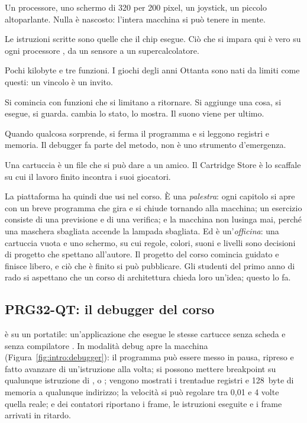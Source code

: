 \begin{description}[style=nextline,leftmargin=1.5em]
\item[Abbastanza piccola da capirla.] Un processore, uno schermo di 320 per
  200 pixel, un joystick, un piccolo altoparlante. Nulla è nascosto: l'intera
  macchina si può tenere in mente.
\item[Vera, non simulata.] Le istruzioni scritte sono quelle che il chip
  esegue. Ciò che si impara qui è vero su ogni processore \riscv, da un
  sensore a un supercalcolatore.
\item[I limiti rendono creativi.] Pochi kilobyte e tre funzioni. I giochi
  degli anni Ottanta sono nati da limiti come questi: un vincolo è un invito.
\item[Una cosa alla volta.] Si comincia con funzioni che si limitano a
  ritornare. Si aggiunge una cosa, si esegue, si guarda.  cambia
  lo stato,  lo mostra. Il suono viene per ultimo.
\item[Guardare dentro.] Quando qualcosa sorprende, si ferma il programma e si
  leggono registri e memoria. Il debugger fa parte del metodo, non è uno
  strumento d'emergenza.
\item[Fare, poi condividere.] Una cartuccia è un file che si può dare a un
  amico. Il Cartridge Store è lo scaffale su cui il lavoro finito incontra i
  suoi giocatori.
\end{description}

La piattaforma ha quindi due usi nel corso. È una \emph{palestra}: ogni
capitolo si apre con un breve programma che gira e si chiude tornando alla
macchina; un esercizio consiste di una previsione e di una verifica; e la
macchina non lusinga mai, perché una maschera sbagliata accende la lampada
sbagliata. Ed è un'\emph{officina}: una cartuccia vuota e uno schermo, su cui
regole, colori, suoni e livelli sono decisioni di progetto che spettano
all'autore. Il progetto del corso comincia guidato e finisce libero, e ciò che
è finito si può pubblicare. Gli studenti del primo anno di rado si aspettano
che un corso di architettura chieda loro un'idea; questo lo fa.

\subsection{PRG32-QT: il debugger del corso}

\prgqt è \prg su un portatile: un'applicazione che esegue le stesse cartucce
senza scheda e senza compilatore \citep{prg32qt}. In modalità debug apre la
macchina (Figura~\ref{fig:intro:debugger}): il programma può essere messo in
pausa, ripreso e fatto avanzare di un'istruzione alla volta; si possono
mettere breakpoint su qualunque istruzione di ,  o
; vengono mostrati i trentadue registri e 128~byte di memoria a
qualunque indirizzo; la velocità si può regolare tra 0,01 e 4 volte quella
reale; e dei contatori riportano i frame, le istruzioni eseguite e i frame
arrivati in ritardo.

